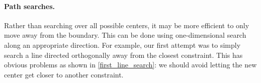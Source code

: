 \paragraph{Path searches.}

% 
% 
% 
% 
% 

Rather than searching over all possible centers, it may be more efficient to only move away from the boundary.
This can be done using one-dimensional search along an appropriate direction.
For example, our first attempt was to simply search a line directed orthogonally away from the closest constraint.
This has obvious problems as shown in \cref{first_line_search}: we should avoid letting the new center get closer to another constraint.    


